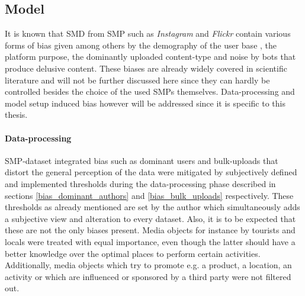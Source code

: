 \subsection*{Model}
It is known that SMD from SMP such as \textit{Instagram} and \textit{Flickr} contain various forms of bias given among others by the demography of the user base \parencite{Heikinheimo2017}, the platform purpose, the dominantly uploaded content-type and noise by bots \parencite{Edwards2014} that produce delusive content. These biases are already widely covered in scientific literature \parencite{Ruths2014, Lazer2014, Zook2017} and will not be further discussed here since they can hardly be controlled besides the choice of the used SMPs themselves. Data-processing and model setup induced bias however will be addressed since it is specific to this thesis. \\

\paragraph*{Data-processing} SMP-dataset integrated bias such as dominant users and bulk-uploads that distort the general perception of the data were mitigated by subjectively defined and implemented thresholds during the data-processing phase described in sections \ref{bias_dominant_authors} and \ref{bias_bulk_uploads} respectively. These thresholds as already mentioned are set by the author which simultaneously adds a subjective view and alteration to every dataset. Also, it is to be expected that these are not the only biases present. Media objects for instance by tourists and locals were treated with equal importance, even though the latter should have a better knowledge over the optimal places to perform certain activities. Additionally, media objects which try to promote e.g. a product, a location, an activity or which are influenced or sponsored by a third party were not filtered out.\\

